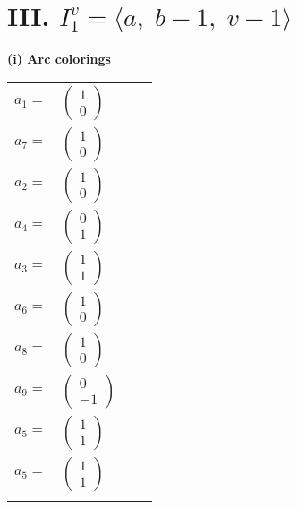 \documentclass[1p]{elsarticle_modified}
\theoremstyle{definition}
\begin{document}
\centering \section*{III. $I^v_{1}= \langle a,\;b-1,\;v-1 \rangle$}
\flushleft \textbf{(i) Arc colorings}\\
\begin{tabular}{m{7pt} m{180pt} m{7pt} m{180pt} }
\flushright $a_{1}=$&$\begin{pmatrix}1\\0\end{pmatrix}$ \\
\flushright $a_{7}=$&$\begin{pmatrix}1\\0\end{pmatrix}$ \\
\flushright $a_{2}=$&$\begin{pmatrix}1\\0\end{pmatrix}$ \\
\flushright $a_{4}=$&$\begin{pmatrix}0\\1\end{pmatrix}$ \\
\flushright $a_{3}=$&$\begin{pmatrix}1\\1\end{pmatrix}$ \\
\flushright $a_{6}=$&$\begin{pmatrix}1\\0\end{pmatrix}$ \\
\flushright $a_{8}=$&$\begin{pmatrix}1\\0\end{pmatrix}$ \\
\flushright $a_{9}=$&$\begin{pmatrix}0\\-1\end{pmatrix}$ \\
\flushright $a_{5}=$&$\begin{pmatrix}1\\1\end{pmatrix}$\\ \flushright $a_{5}=$&$\begin{pmatrix}1\\1\end{pmatrix}$\\&\end{tabular}
\end{document}
